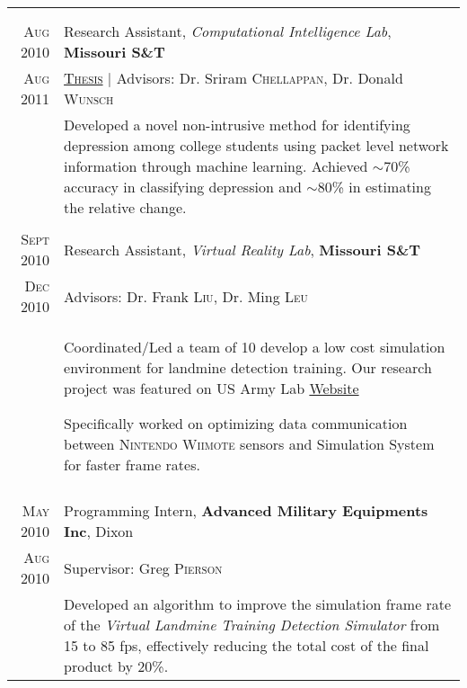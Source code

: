 \documentclass[a4paper,11pt]{article}
\begin{document}
\begin{longtable}{r|p{12.5cm}}
{\begin{minipage}[t]{12.5cm}
\begin{compactitem}
\end{compactitem}
 \end{minipage}}
 \\
 \multicolumn{2}{c}{}
 \\
 \textsc{Aug 2010} & Research Assistant, \emph{Computational Intelligence Lab}, \normalsize \textbf{Missouri S\&T} \\
 \textsc{Aug 2011} & \textsc{\href{https://github.com/raghakot/papers/blob/master/thesis.pdf}{Thesis}} | \small Advisors: Dr. Sriram \textsc{Chellappan}, Dr. Donald \textsc{Wunsch} \\
 & \footnotesize{ \begin{minipage}[t]{12.5cm} Developed a novel non-intrusive method for identifying depression among college students using packet level network information through machine learning. Achieved $\sim$70\% accuracy in classifying depression and $\sim$80\% in estimating the relative change.
 \end{minipage}}
 \\
 \multicolumn{2}{c}{}
 \\
 \textsc{Sept 2010} & Research Assistant, \emph{Virtual Reality Lab}, \normalsize \textbf{Missouri S\&T} \\
 \textsc{Dec 2010} & \small Advisors: Dr. Frank \textsc{Liu}, Dr. Ming \textsc{Leu} \\
 & \footnotesize{ \begin{minipage}[t]{12.5cm} \begin{compactitem}
     \item Coordinated/Led a team of 10 develop a low cost simulation environment for landmine detection training. Our research project was featured on US Army Lab \href{http://www.arl.army.mil/www/default.cfm?page=640}{Website}
     \item Specifically worked on optimizing data communication between \textsc{Nintendo Wiimote} sensors and Simulation System for faster frame rates.
     \end{compactitem}
 \end{minipage}}
 \\
 \multicolumn{2}{c}{}
 \\
 \textsc{May 2010} & Programming Intern, \normalsize \textbf{Advanced Military Equipments Inc}, Dixon \\
 \textsc{Aug 2010} & \small Supervisor: Greg \textsc{Pierson} \\
 & \footnotesize{ \begin{minipage}[t]{12.5cm} Developed an algorithm to improve the simulation frame rate of the \emph{Virtual Landmine Training Detection Simulator} from 15 to 85 fps, effectively reducing the total cost of the final product by 20\%.

\end{minipage}}
\end{longtable}
\end{document}
